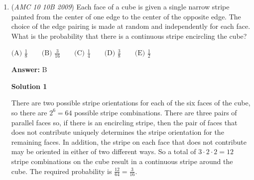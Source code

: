 \begin{enumerate}
 Knowing this, we can now easily see that the intersection point must be on the bottom side of our picture, as it lies on the bottom leg of the rightmost trapezoid. And by symmetry the point must be in the center of this side.

 



\textbf{Solution 2}

A decagon can be formed from the trapezoids and the base. The sum of the decagon's angles is $180(10-2)=1440^\circ$. Letting the larger angle in each trapezoid be $x$, the two angles formed by the line each measures $(180-x)^\circ$. There are $8$ congruent angles left. Each of those angles measures $(360-2x)^\circ$.  Putting it all together: $8(360-2x)+2(180-x)=1440\implies x=\boxed{\mathrm{(A)\ }100^\circ}$.

 



\textbf{Solution 3}

If we reflect the arch across the line, we form an 18-gon. $\frac{180*(18-2)}{18} = 160^\circ$ so each interior angle of the 18-gon is $160^\circ$. Let $x$ be the degree measure of the larger interior angle of a trapezoid. From the diagram, we see that $2x + 160 = 360$, so $2x = 200$ and $x = 100$, or $\boxed{A}$.

 


	\item (\textit{AMC 10 10B 2009}) Each face of a cube is given a single narrow stripe painted from the center of one edge to the center of the opposite edge.  The choice of the edge pairing is made at random and independently for each face.  What is the probability that there is a continuous stripe encircling the cube?


 $\text{(A) } \frac 18 \qquad \text{(B) } \frac {3}{16} \qquad \text{(C) } \frac 14 \qquad \text{(D) } \frac 38 \qquad \text{(E) } \frac 12$

 \textbf{Answer: }B



\textbf{Solution 1}

There are two possible stripe orientations for each of the six faces of the cube, so there are $2^6 = 64$ possible stripe combinations.  There are three pairs of parallel faces so, if there is an encircling stripe, then the pair of faces that does not contribute uniquely determines the stripe orientation for the remaining faces.  In addition, the stripe on each face that does not contribute may be oriented in either of two different ways. So a total of $3 \cdot 2 \cdot 2 = 12$ stripe combinations on the cube result in a continuous stripe around the cube.  The required probability is $\frac {12}{64} = \boxed{\frac {3}{16}}$.


\end{enumerate}
